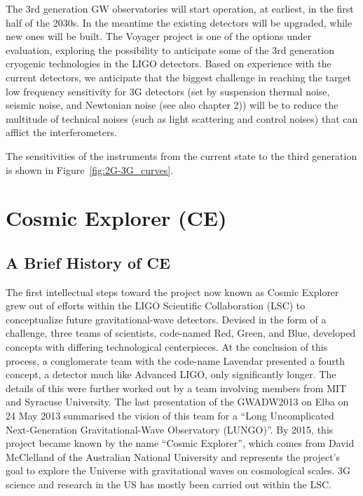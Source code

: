 \documentclass[graybox, nosecnum]{svmult}
\begin{document}
The 3rd generation GW observatories will start operation, at earliest, in the first half of the 2030s. 
In the meantime the existing detectors will be upgraded, while new ones will be built. The Voyager project is one of the options under evaluation, exploring the possibility to anticipate some of the 3rd generation cryogenic technologies in the LIGO detectors.
Based on experience with the current detectors, we anticipate that the biggest challenge in reaching the target low frequency sensitivity for 3G detectors (set by suspension thermal noise, seismic noise, and Newtonian noise {\color{green} (see also chapter 2)}) will be to reduce the multitude of technical noises (such as light scattering and control noises) that can afflict the interferometers. 

The sensitivities of the instruments from the current state to the third generation is shown in Figure~\ref{fig:2G-3G_curves}. 

\section{Cosmic Explorer (CE)}

\subsection{A Brief History of CE}

The first intellectual steps toward the project now known as Cosmic Explorer grew out of efforts within the LIGO Scientific Collaboration (LSC) to conceptualize future gravitational-wave detectors. Devised in the form of a challenge, three teams of scientists, code-named Red, Green, and Blue, developed concepts with differing technological centerpieces. At the conclusion of this process, a conglomerate team with the code-name Lavendar presented a fourth concept, a detector much like Advanced LIGO, only significantly longer. The details of this were further worked out by a team involving members from  MIT and Syracuse University. The last presentation of the GWADW2013 on Elba on 24 May 2013 summarised the vision of this team for a ``Long Uncomplicated Next-Generation Gravitational-Wave Observatory (LUNGO)''\cite{LUNGO}. By 2015, this project became known by the name ``Cosmic Explorer'', which comes from David McClelland of the Australian National University and represents the project's goal to explore the Universe with gravitational waves on cosmological scales. 3G science and research in the US has mostly been carried out within the LSC. 
\end{document}
